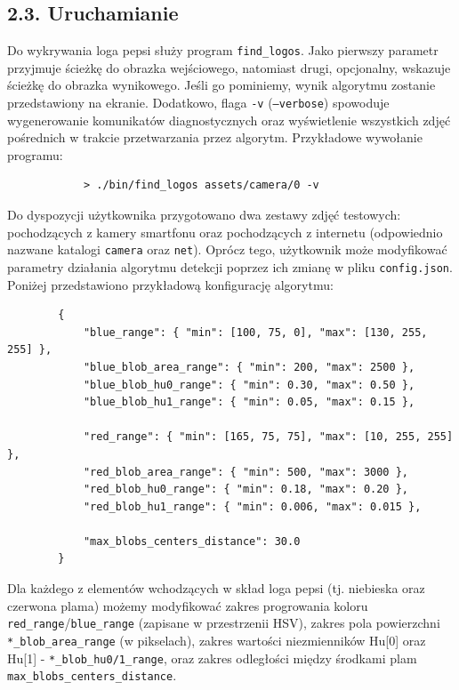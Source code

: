 \documentclass[11pt,a4paper,twoside]{report}
\begin{document}
	\subsection*{2.3. Uruchamianie}

		Do wykrywania loga pepsi służy program \texttt{find\_logos}. Jako pierwszy parametr przyjmuje ścieżkę do obrazka wejściowego, natomiast drugi, opcjonalny, wskazuje ścieżkę do obrazka wynikowego. Jeśli go pominiemy, wynik algorytmu zostanie przedstawiony na ekranie. Dodatkowo, flaga \texttt{-v} (\texttt{--verbose}) spowoduje wygenerowanie komunikatów diagnostycznych oraz wyświetlenie wszystkich zdjęć pośrednich w trakcie przetwarzania przez algorytm. Przykładowe wywołanie programu:

		\begin{verbatim}
		    > ./bin/find_logos assets/camera/0 -v
		\end{verbatim}

		Do dyspozycji użytkownika przygotowano dwa zestawy zdjęć testowych: pochodzących z kamery smartfonu oraz pochodzących z internetu (odpowiednio nazwane katalogi \texttt{camera} oraz \texttt{net}). Oprócz tego, użytkownik może modyfikować parametry działania algorytmu detekcji poprzez ich zmianę w pliku \texttt{config.json}. Poniżej przedstawiono przykładową konfigurację algorytmu:

		\begin{verbatim}
		{
		    "blue_range": { "min": [100, 75, 0], "max": [130, 255, 255] },
		    "blue_blob_area_range": { "min": 200, "max": 2500 },
		    "blue_blob_hu0_range": { "min": 0.30, "max": 0.50 },
		    "blue_blob_hu1_range": { "min": 0.05, "max": 0.15 },

		    "red_range": { "min": [165, 75, 75], "max": [10, 255, 255] },
		    "red_blob_area_range": { "min": 500, "max": 3000 },
		    "red_blob_hu0_range": { "min": 0.18, "max": 0.20 },
		    "red_blob_hu1_range": { "min": 0.006, "max": 0.015 },

		    "max_blobs_centers_distance": 30.0
		}
		\end{verbatim}

		Dla każdego z elementów wchodzących w skład loga pepsi (tj. niebieska oraz czerwona plama) możemy modyfikować zakres progrowania koloru \texttt{red\_range}/\texttt{blue\_range} (zapisane w przestrzenii HSV), zakres pola powierzchni \texttt{*\_blob\_area\_range} (w pikselach), zakres wartości niezmienników Hu[0] oraz Hu[1] - \texttt{*\_blob\_hu0/1\_range}, oraz zakres odległości między środkami plam \texttt{max\_blobs\_centers\_distance}.
\end{document}
